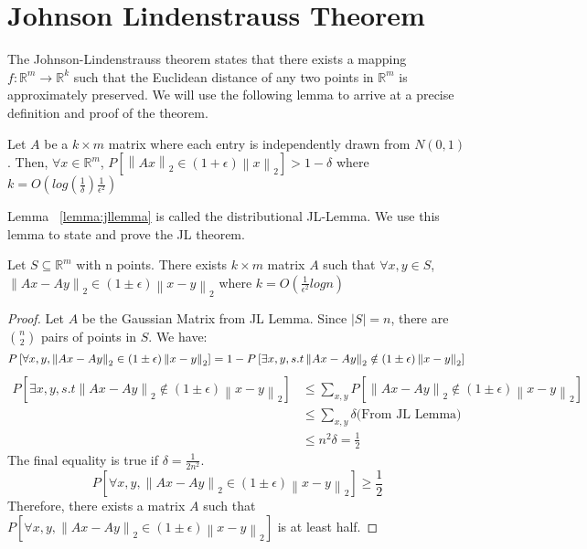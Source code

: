 \documentclass[11pt]{article}
\newcommand{\norm}[1]{\left\lVert#1\right\rVert}
\begin{document}
\section{Johnson Lindenstrauss Theorem}
The Johnson-Lindenstrauss theorem states that there exists a mapping $f:\mathbb{R}^m\to \mathbb{R}^k$ such that the Euclidean distance of any two points in $\mathbb{R}^m$ is approximately preserved. We will use the following lemma to arrive at a precise definition and proof of the theorem.

\begin{lemma}
\label{lemma:jllemma}
Let $A$ be a $k\times m$ matrix where each entry is independently drawn from $N(0,1)$. Then, $\forall x\in \mathbb{R}^m$, $P\left[\norm{Ax}_2\in (1+\epsilon) \norm{x}_2 \right]>1-\delta$ where $k=O\left(log(\frac{1}{\delta})\frac{1}{\epsilon^2}\right)$
\end{lemma}

Lemma ~\ref{lemma:jllemma} is called the distributional JL-Lemma. We use this lemma to state and prove the JL theorem.
\begin{theorem}
\label{thm:jltheorem}
Let $S\subseteq \mathbb{R}^m$ with n points. There exists $k\times m$ matrix $A$ such that $\forall x,y\in S$,$\norm{Ax - Ay}_2\in (1\pm \epsilon) \norm{x - y}_2$ where $k=O\left(\frac{1}{\epsilon^2}logn\right)$
\end{theorem}

\begin{proof}
Let $A$ be the Gaussian Matrix from JL Lemma. Since $|S|=n$, there are $n\choose 2$ pairs of points in $S$. We have: \\
\begin{equation}
P\left[\forall x, y, \norm{Ax-Ay}_2\in (1\pm\epsilon) \norm{x-y}_2 \right] = 1- P\left[\exists x, y, s.t \norm{Ax-Ay}_2\notin (1\pm\epsilon) \norm{x-y}_2 \right]\\
\end{equation}
\begin{equation}
\begin{split}
P\left[\exists x, y, s.t \norm{Ax-Ay}_2\notin (1\pm\epsilon) \norm{x-y}_2 \right] &\leq \sum_{x,y} P\left[\norm{Ax-Ay}_2\notin (1\pm\epsilon) \norm{x-y}_2 \right]\\
&\leq \sum_{x,y} \delta \text{(From JL Lemma)}\\ 
&\leq n^2 \delta = \frac{1}{2}
\end{split}
\end{equation}
The final equality is true if $\delta=\frac{1}{2n^2}$. 
\begin{equation}
P\left[\forall x, y, \norm{Ax-Ay}_2\in (1\pm\epsilon) \norm{x-y}_2 \right] \geq \frac{1}{2}
\end{equation}
Therefore, there exists a matrix $A$ such that $P\left[\forall x, y, \norm{Ax-Ay}_2\in (1\pm\epsilon) \norm{x-y}_2 \right]$ is at least half. 
\end{proof}
\end{document}
